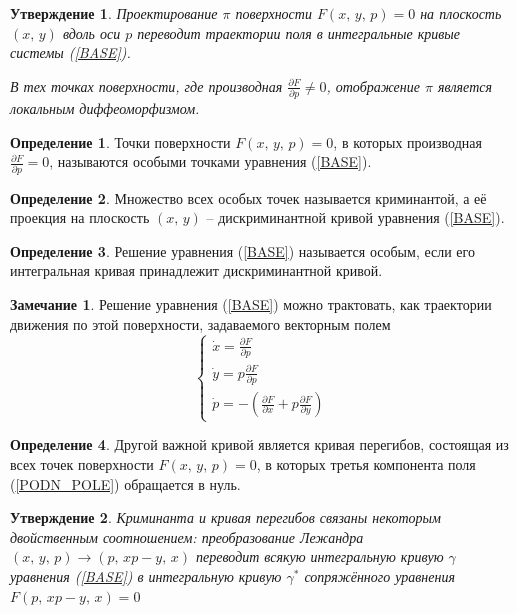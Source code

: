 \documentclass[a4paper,12pt]{article}
\theoremstyle{plain}
\newtheorem{proposition}{Утверждение}[section]
\theoremstyle{definition}
\newtheorem{definition}{Определение}[section]
\newtheorem*{note}{Замечание}
\theoremstyle{remark}
\begin{document}
\begin{proposition}
	Проектирование $\pi$ поверхности $F(x,\,y,\,p) = 0$ на плоскость $(x,\,y)$ вдоль оси $p$ переводит траектории поля в интегральные кривые системы (\ref*{BASE}).

	В тех точках поверхности, где производная $\frac{\partial F}{\partial p} \neq 0$, отображение $\pi$ является локальным диффеоморфизмом.
\end{proposition}

\begin{definition}
	Точки поверхности $F(x,\,y,\,p) = 0$, в которых производная $\frac{\partial F}{\partial p} = 0$, называются особыми точками уравнения (\ref*{BASE}).
\end{definition}

\begin{definition}
	Множество всех особых точек называется криминантой, а её проекция на плоскость $(x,\,y)$ -- дискриминантной кривой уравнения (\ref*{BASE}).
\end{definition}

\begin{definition}
	Решение уравнения (\ref*{BASE}) называется особым, если его интегральная кривая принадлежит дискриминантной кривой.
\end{definition}

\begin{note}
	Решение уравнения (\ref*{BASE}) можно трактовать, как траектории движения по этой поверхности, задаваемого векторным полем
	\begin{equation}
		\label{PODN_POLE}
		\begin{cases}
			\dot{x} = \frac{\partial F}{\partial p}  \\
			\dot{y} = p\frac{\partial F}{\partial p} \\
			\dot{p} = -\left(\frac{\partial F}{\partial x} + p\frac{\partial F}{\partial y} \right)
		\end{cases}
	\end{equation}
\end{note}

\begin{definition}
	Другой важной кривой является кривая перегибов, состоящая из всех точек поверхности $F(x,\,y,\,p) = 0$, в которых третья компонента поля (\ref*{PODN_POLE}) обращается в нуль.
\end{definition}

\begin{proposition}
	Криминанта и кривая перегибов связаны некоторым двойственным соотношением: преобразование Лежандра $(x,\,y,\,p) \to (p,\, xp - y,\, x)$ переводит всякую интегральную кривую $\gamma$ уравнения (\ref*{BASE}) в интегральную кривую $\gamma^*$ сопряжённого уравнения $F(p,\, xp - y,\, x) = 0$
\end{proposition}
\end{document}

